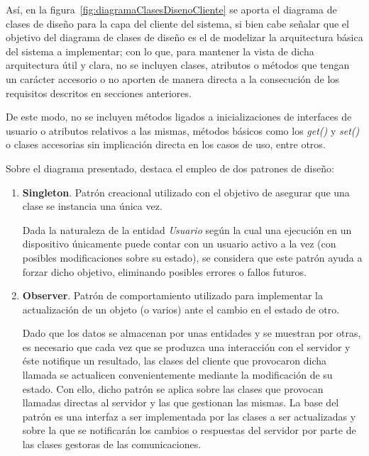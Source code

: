Así, en la figura~\ref{fig:diagramaClasesDisenoCliente} se aporta el diagrama de clases de diseño para la capa del cliente del sistema, si bien cabe señalar que el objetivo del diagrama de clases de diseño es el de modelizar la arquitectura básica del sistema a implementar; con lo que, para mantener la vista de dicha arquitectura útil y clara, no se incluyen clases, atributos o métodos que tengan un carácter accesorio o no aporten de manera directa a la consecución de los requisitos descritos en secciones anteriores. 

De este modo, no se incluyen métodos ligados a inicializaciones de interfaces de usuario o atributos relativos a las mismas, métodos básicos como los \textit{get()} y \textit{set()} o clases accesorias sin implicación directa en los casos de uso, entre otros.

Sobre el diagrama presentado, destaca el empleo de dos patrones de diseño:

\begin{enumerate}
	\item \textbf{Singleton}. Patrón creacional utilizado con el objetivo de asegurar que una clase se instancia una única vez. 
	
	Dada la naturaleza de la entidad \emph{Usuario} según la cual una ejecución en un dispositivo únicamente puede contar con un usuario activo a la vez (con posibles modificaciones sobre su estado), se considera que este patrón ayuda a forzar dicho objetivo, eliminando posibles errores o fallos futuros.
	\item \textbf{Observer}. Patrón de comportamiento utilizado para implementar la actualización de un objeto (o varios) ante el cambio en el estado de otro.
	
	Dado que los datos se almacenan por unas entidades y se muestran por otras, es necesario que cada vez que se produzca una interacción con el servidor y éste notifique un resultado, las clases del cliente que provocaron dicha llamada se actualicen convenientemente mediante la modificación de su estado. Con ello, dicho patrón se aplica sobre las clases que provocan llamadas directas al servidor y las que gestionan las mismas. La base del patrón es una interfaz a ser implementada por las clases a ser actualizadas y sobre la que se notificarán los cambios o respuestas del servidor por parte de las clases gestoras de las comunicaciones.
\end{enumerate} 


